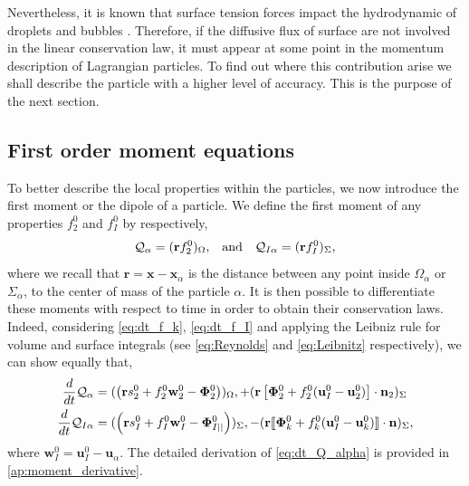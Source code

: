 Nevertheless, it is known that surface tension forces impact the hydrodynamic of droplets and bubbles \citep{kentheswaran2022direct,pesci2018computational}. 
Therefore, if the diffusive flux of surface are not involved in the linear conservation law, it must appear at some point in the momentum description of Lagrangian particles. 
To find out where this contribution arise we shall describe the particle with a higher level of accuracy. 
This is the purpose of the next section. 

\subsection{First order moment equations}

To better describe the local properties within the particles, we now introduce the first moment or the dipole of a particle.
We define the first moment of any properties $f_2^0$ and $f_I^0$ by respectively,
\begin{align}
    &\mathcal{Q}_\alpha 
    = (  \textbf{r} f_2^0  )_{\Omega},
    &\text{and}&
    &\mathcal{Q}_{I\alpha}
    = (  \textbf{r} f_I^0  )_{\Sigma},
    \label{eq:first_moment_definition}
\end{align}
where we recall that $\textbf{r} = \textbf{x} - \textbf{x}_\alpha$ is the distance between any point inside $\Omega_\alpha$ or $\Sigma_\alpha$, to the center of mass of the particle $\alpha$.
It is then possible to differentiate these moments with respect to time in order to obtain their conservation laws.
Indeed, considering \ref{eq:dt_f_k}, \ref{eq:dt_f_I} and applying the Leibniz rule for volume and surface integrals (see \ref{eq:Reynolds} and \ref{eq:Leibnitz} respectively), we can show equally that,
\begin{align}
    \frac{d}{d t} {\mathcal{Q}_\alpha}
    &= (  \left(
        \textbf{r} s_2^0         
        + f_2^0  \textbf{w}_2^0 
        - \mathbf{\Phi}_2^0
    \right)  )_{\Omega},
    + (  \textbf{r} \left[
        \mathbf{\Phi}_2^0
        + f_2^0 (\textbf{u}_I^0-\textbf{u}_2^0)
    \right]\cdot \textbf{n}_2   )_{\Sigma} 
    \label{eq:dt_Q_alpha}\\
    \frac{d}{d t} {\mathcal{Q}_{I\alpha}}
    &= (  \left(
        \textbf{r}s_I^0
        + f_I^0 \textbf{w}_I^0
        - \mathbf{\Phi}_{I||}^0
    \right)  )_{\Sigma},
    - ( \textbf{r} 
    \llbracket \mathbf{\Phi}_k^0
        + f_k^0 (\textbf{u}_I^0 - \textbf{u}_k^0)
     \rrbracket \cdot \textbf{n}
     )_{\Sigma},
    \label{eq:dt_Q_I_alpha}
\end{align}
where $\textbf{w}_I^0 = \textbf{u}_I^0 - \textbf{u}_\alpha$.
The detailed derivation of \ref{eq:dt_Q_alpha} is provided in \ref{ap:moment_derivative}.
